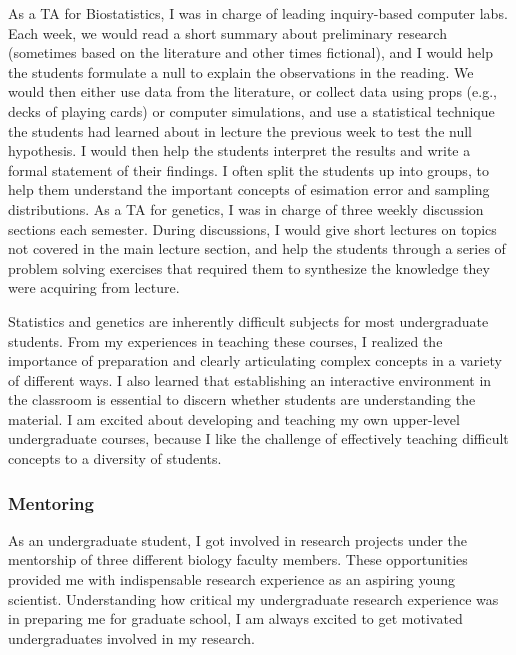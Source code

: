 \documentclass[10pt]{article}
\begin{document}
As a TA for Biostatistics, I was in charge of leading inquiry-based computer
labs.
Each week, we would read a short summary about preliminary research (sometimes
based on the literature and other times fictional), and I would help the
students formulate a null to explain the observations in the reading.
We would then either use data from the literature, or collect data using props
(e.g., decks of playing cards) or computer simulations, and use a statistical
technique the students had learned about in lecture the previous week to test
the null hypothesis.
I would then help the students interpret the results and write a formal
statement of their findings.
I often split the students up into groups, to help them understand the
important concepts of esimation error and sampling distributions.
As a TA for genetics, I was in charge of three weekly discussion sections each
semester.
During discussions, I would give short lectures on topics not covered in the
main lecture section, and help the students through a series of problem solving
exercises that required them to synthesize the knowledge they were acquiring
from lecture.

Statistics and genetics are inherently difficult subjects for most
undergraduate students.
From my experiences in teaching these courses, I realized the importance of
preparation and clearly articulating complex concepts in a variety of different
ways.
I also learned that establishing an interactive environment in the classroom is
essential to discern whether students are understanding the material.
I am excited about developing and teaching my own upper-level undergraduate
courses, because I like the challenge of effectively teaching difficult
concepts to a diversity of students.

\subsubsection*{Mentoring}
As an undergraduate student, I got involved in research projects under the
mentorship of three different biology faculty members.
These opportunities provided me with indispensable research experience as an
aspiring young scientist.
Understanding how critical my undergraduate research experience was in
preparing me for graduate school, I am always excited to get motivated
undergraduates involved in my research.
\end{document}
